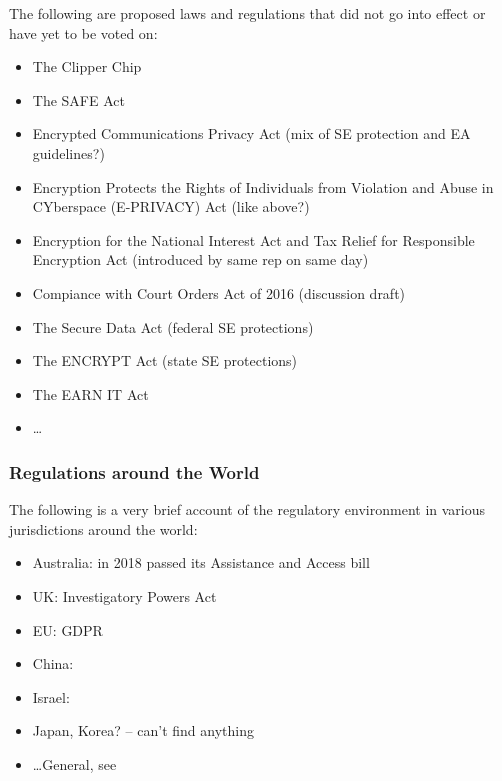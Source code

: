 The following are proposed laws and regulations that did not go into effect or have yet to be voted on:

\begin{itemize}
    \item The Clipper Chip \cite{press_1993} \cite{thompson_2015}
    \item The SAFE Act \cite{goodlatte_hr3011_1996}
    \item Encrypted Communications Privacy Act (mix of SE protection and EA guidelines?) \cite{leahy_s376_1997}
    \item Encryption Protects the Rights of Individuals from Violation and Abuse in CYberspace (E-PRIVACY) Act
        (like above?) \cite{ashcroft_s2067_1998}
    \item Encryption for the National Interest Act and Tax Relief for Responsible Encryption Act (introduced by same rep
        on same day) \cite{goss_hr2616_1999} \cite{goss_hr2617_1999}
    \item Compiance with Court Orders Act of 2016 (discussion draft) \cite{burr_2016}
    \item The Secure Data Act (federal SE protections) \cite{lofgren_hr5823_2018}
    \item The ENCRYPT Act (state SE protections) \cite{lieu_hr4170_2019}
    \item The EARN IT Act \cite{graham_s3398_2020}
    \item \dots
\end{itemize}

\subsubsection*{Regulations around the World}

The following is a very brief account of the regulatory environment in various jurisdictions around the world:

\begin{itemize}
    \item Australia: in 2018 passed its Assistance and Access bill \cite{ag_2018} \cite{newman_2018}
    \item UK: Investigatory Powers Act \cite{legislature_2016}
    \item EU: GDPR \cite{parliament_2016}
    \item China: \cite{donahue_comparative_2018}
    \item Israel: \cite{donahue_comparative_2018}
    \item Japan, Korea? -- can't find anything
    \item \dots General, see \cite{budish_encryption_2018}
\end{itemize}

